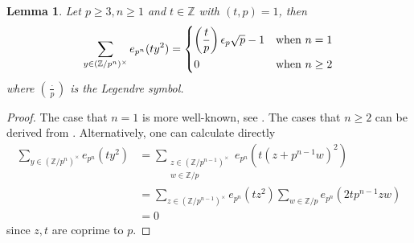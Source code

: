 \documentclass[11pt]{amsart}
\theoremstyle{plain} %
\newtheorem{lem}[thm]{Lemma}
\theoremstyle{remark}
\numberwithin{equation}{section}
\newcommand{\Z}{\mathbb{Z}}
\begin{document}
\begin{lem}\label{reduced Gauss sums}
    Let $p\geq3,n\geq1$ and $t\in \Z$ with $(t,p)=1$, then
    \begin{equation*}
        \sum_{y\in(\Z/p^n)^{\times}}e_{p^n}(ty^2)=\begin{dcases}
            \left(\frac{t}{p}\right)\epsilon_p\sqrt{p}-1&\text{when $n=1$}\\
            0&\text{when $n\geq2$}
        \end{dcases}
    \end{equation*}
    where $\left(\frac{\cdot}{p}\right)$ is the Legendre symbol.
\end{lem}

\begin{proof}
    The case that $n=1$ is more well-known, see \cite[Chapter 3, Section 3.5, Theorem 3.3]{ANT}. The cases that $n\geq 2$ can be derived from \cite[Chapter 3, Section 3.4, Lemma 3.1]{ANT}. Alternatively, one can calculate directly
    \begin{equation*}
        \begin{split}
            \sum_{y\in(\Z/p^n)^{\times}}e_{p^n}(ty^2)&=\sum_{\substack{z\in(\Z/p^{n-1})^{\times}\\w\in\Z/p}}e_{p^n}(t(z+p^{n-1}w)^2)\\
            &=\sum_{z\in(\Z/p^{n-1})^{\times}}e_{p^n}(tz^2)\sum_{w\in\Z/p}e_{p^n}(2tp^{n-1}zw)\\
            &=0
        \end{split}
    \end{equation*}
    since $z,t$ are coprime to $p$.
\end{proof}
\end{document}
